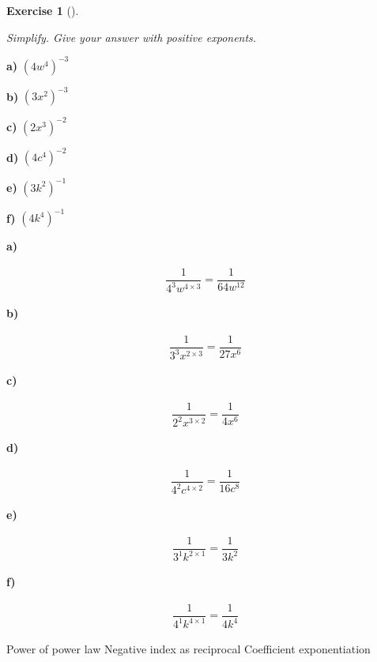 \documentclass[
  letterpaper,
  DIV=11,
  numbers=noendperiod]{scrreprt}
\theoremstyle{definition}
\newtheorem{exercise}{Exercise}[chapter]
\theoremstyle{remark}
\begin{document}
\begin{exercise}[]\protect\hypertarget{exr-u2-11}{}\label{exr-u2-11}

\emph{Simplify. Give your answer with positive exponents.}

\textbf{a)} \(\displaystyle (4w^{4})^{-3}\)

\textbf{b)} \(\displaystyle (3x^{2})^{-3}\)

\textbf{c)} \(\displaystyle (2x^{3})^{-2}\)

\textbf{d)} \(\displaystyle (4c^{4})^{-2}\)

\textbf{e)} \(\displaystyle (3k^{2})^{-1}\)

\textbf{f)} \(\displaystyle (4k^{4})^{-1}\)

\begin{tcolorbox}[enhanced jigsaw, opacitybacktitle=0.6, coltitle=black, arc=.35mm, colframe=quarto-callout-tip-color-frame, colback=white, bottomrule=.15mm, left=2mm, colbacktitle=quarto-callout-tip-color!10!white, titlerule=0mm, opacityback=0, title=\textcolor{quarto-callout-tip-color}{\faLightbulb}\hspace{0.5em}{🔍 View Solutions}, leftrule=.75mm, breakable, rightrule=.15mm, bottomtitle=1mm, toptitle=1mm, toprule=.15mm]

\textbf{a)}

\[
\begin{aligned}
\dfrac{1}{4^{3}w^{4\times 3}} = \dfrac{1}{64w^{12}}
\end{aligned}
\]

\textbf{b)}

\[
\begin{aligned}
\dfrac{1}{3^{3}x^{2\times 3}} = \dfrac{1}{27x^{6}}
\end{aligned}
\]

\textbf{c)}

\[
\begin{aligned}
\dfrac{1}{2^{2}x^{3\times 2}} = \dfrac{1}{4x^{6}}
\end{aligned}
\]

\textbf{d)}

\[
\begin{aligned}
\dfrac{1}{4^{2}c^{4\times 2}} = \dfrac{1}{16c^{8}}
\end{aligned}
\]

\textbf{e)}

\[
\begin{aligned}
\dfrac{1}{3^{1}k^{2\times 1}} = \dfrac{1}{3k^{2}}
\end{aligned}
\]

\textbf{f)}

\[
\begin{aligned}
\dfrac{1}{4^{1}k^{4\times 1}} = \dfrac{1}{4k^{4}}
\end{aligned}
\]

\end{tcolorbox}

{Power of power law} {Negative index as reciprocal} {Coefficient
exponentiation}

\end{exercise}
\end{document}
